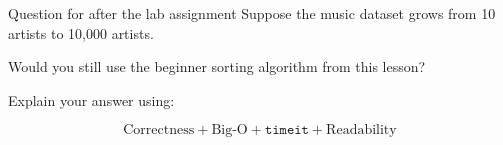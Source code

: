 \documentclass[11pt,aspectratio=43]{beamer}
\begin{document}
\begin{frame}{Question for after the lab assignment}
  Suppose the music dataset grows from 10 artists to 10,000 artists.

  \vspace{0.3cm}
  Would you still use the beginner sorting algorithm from this lesson?

  \vspace{0.4cm}
  Explain your answer using:

  \[
    \boxed{\text{Correctness} + \text{Big-O} + \texttt{timeit} + \text{Readability}}
  \]
\end{frame}
\end{document}
